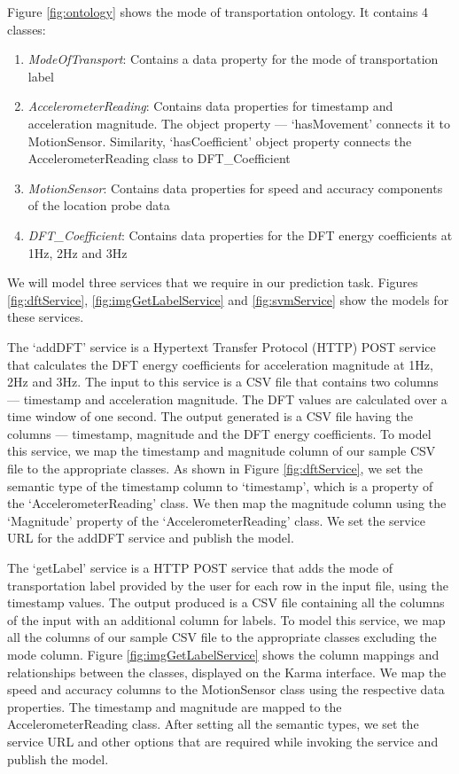 Figure \ref{fig:ontology} shows the mode of transportation ontology. It contains 4 classes:
\begin{enumerate}
  \item \textit{ModeOfTransport}: Contains a data property for the mode of transportation label
  \item \textit{AccelerometerReading}: Contains data properties for timestamp and acceleration magnitude. The object property --- `hasMovement' connects it to MotionSensor. Similarity, `hasCoefficient' object property connects the AccelerometerReading class to DFT\_Coefficient
  \item \textit{MotionSensor}: Contains data properties for speed and accuracy components of the location probe data
  \item \textit{DFT\_Coefficient}: Contains data properties for the DFT energy coefficients at 1Hz, 2Hz and 3Hz
\end{enumerate} 

We will model three services that we require in our prediction task. Figures \ref{fig:dftService}, \ref{fig:imgGetLabelService} and \ref{fig:svmService} show the models for these services.

The `addDFT' service is a Hypertext Transfer Protocol (HTTP) POST service that calculates the DFT energy coefficients for acceleration magnitude at 1Hz, 2Hz and 3Hz. The input to this service is a CSV file that contains two columns --- timestamp and acceleration magnitude. The DFT values are calculated over a time window of one second. The output generated is a CSV file having the columns --- timestamp, magnitude and the DFT energy coefficients. To model this service, we map the timestamp and magnitude column of our sample CSV file to the appropriate classes. As shown in Figure \ref{fig:dftService}, we set the semantic type of the timestamp column to `timestamp', which is a property of the `AccelerometerReading' class. We then map the magnitude column using the `Magnitude' property of the `AccelerometerReading' class. We set the service URL for the addDFT service and publish the model.

The `getLabel' service is a HTTP POST service that adds the mode of transportation label provided by the user for each row in the input file, using the timestamp values. The output produced is a CSV file containing all the columns of the input with an additional column for labels. To model this service, we map all the columns of our sample CSV file to the appropriate classes excluding the mode column. Figure \ref{fig:imgGetLabelService} shows the column mappings and relationships between the classes, displayed on the Karma interface. We map the speed and accuracy columns to the MotionSensor class using the respective data properties. The timestamp and magnitude are mapped to the AccelerometerReading class. After setting all the semantic types, we set the service URL and other options that are required while invoking the service and publish the model. 

